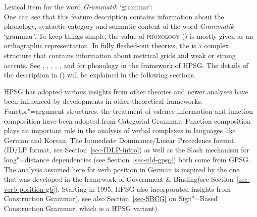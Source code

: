 \ea
Lexical item for the word \emph{Grammatik} `grammar':\\
\z
One can see that this feature description contains information about the phonology, syntactic
category and semantic content of the word \emph{Grammatik} `grammar'. To keep things simple, the
value of \textsc{phonology} (\phon) is mostly given as an orthographic representation. In fully
fleshed-out theories, the \phonv is a complex structure that contains information about metrical
grids and weak or strong accents.  See , ,
, , , and
 for phonology in the framework of HPSG. The details of the
description in () will be explained in the following sections.

HPSG has adopted various insights from other theories and newer analyses have been influenced by
developments in other theoretical frameworks.  Functor"=argument structures, the treatment of
valence information and function composition have been adopted from
Categorial Grammar\indexcg. Function composition plays an important role in the analysis of verbal
complexes in languages like German and Korean. The Immediate
Dominance/Linear Precedence format
(ID/LP format, see Section~\ref{sec-IDLP-intro}) as well as the Slash mechanism for long"=distance
dependencies (see Section~\ref{sec-nld-gpsg}) both come from GPSG\indexgpsg. The analysis assumed
here for verb position in German is inspired by the one that was developed in the framework of
Government \& Binding\indexgb (see Section~\ref{sec-verb-position-gb}). Starting in 1995, HPSG also
incorporated insights from Construction Grammar\indexcxg (\citealt{Sag97a}, see also
Section~\ref{sec-SBCG} on Sign"=Based Construction Grammar, which is a HPSG variant).

